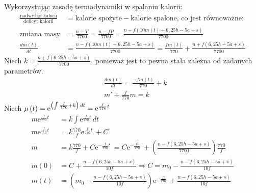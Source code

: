 \documentclass{article}
\newcounter{mojlicznik}  %
\begin{document}
\begin{enumerate}
    Wykorzystując  zasadę termodynamiki w spalaniu kalorii:
    \begin{align*}
         \frac{\text{nadwyżka kalorii}}{\text{deficyt kalorii}} &= \text{kalorie spożyte} - \text{kalorie spalone} \text{, co jest równoważne:}\\
        \text{zmiana masy} &= \frac{n-T}{7700} = \frac{n - fP}{7700} = \frac{n - f\left( 10m\left(t\right) + 6,25h - 5a + s\right)}{7700}\\
        \frac{dm\left(t\right)}{dt} &= \frac{n - f\left( 10m\left(t\right) + 6,25h - 5a + s\right)}{7700} = \frac{fm\left( t \right)}{770} + \frac{n + f\left( 6,25h - 5a +s \right)}{7700}
    \end{align*}
    Niech $k = \frac{n + f\left( 6,25h - 5a +s \right)}{7700}$, ponieważ jest to pewna stała zależna od zadanych parametrów.
    \begin{align*}
        &\frac{dm\left(t\right)}{dt} = \frac{-fm\left(t\right)}{770} + k\\
        &m' + \frac{f}{770}m = k
    \end{align*}
    Niech $ \mu\left(t\right) = \mathrm{e}^{\left(\int \frac{f}{770} + k \right) \, dt\\} = \mathrm{e}^{\frac{f}{770}t}\  $ \\ 
    \begin{align*}
        m\mathrm{e}^{\frac{f}{770}t}\ &= k\int \mathrm{e}^{\frac{f}{770}t}\, dt\ \\
        m\mathrm{e}^{\frac{f}{770}t}\ &= k\frac{770}{f}
        \mathrm{e}^{\frac{f}{770}t}\ + C\\
        m &= k\frac{770}{f} + C \mathrm{e}^{-\frac{f}{770}t}\ = C\mathrm{e}^{-\frac{ft}{770}}\ + \left(\frac{n-f\left(6,25h - 5a + s\right)}{7700}\right)\frac{770}{f}\\
        m\left(0\right) &= C + \frac{n-f\left(6,25h - 5a + s\right)}{10f} \Rightarrow{C = m_0 - \frac{n-f\left(6,25h - 5a + s\right)}{10f}}\\
        m\left(t\right) &= \left( m_0 - \frac{n-f\left(6,25h - 5a + s\right)}{10f}\right)\mathrm{e}^{-\frac{ft}{770}}\ + \frac{n-f\left(6,25h - 5a + s\right)}{10f}
    \end{align*}


\end{enumerate}
\end{document}
